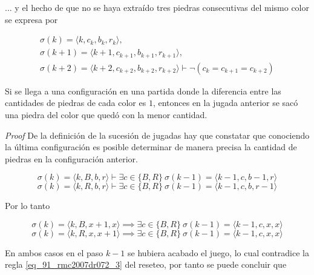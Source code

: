 ... y el hecho de que no se haya extraído tres piedras consecutivas del mismo color se expresa por 

\begin{equation} \label{eq_91_rmc2007dr072_5}
\begin{gathered}
	\sigma(k) = \langle k, c_k, b_k, r_k \rangle , \\
	\sigma(k+1) = \langle k+1, c_{k+1}, b_{k+1}, r_{k+1} \rangle, \\
	\sigma(k+2) = \langle k+2, c_{k+2}, b_{k+2}, r_{k+2} \rangle \vdash \neg (c_{k} = c_{k+1} = c_{k+2})
\end{gathered}
\end{equation}

\begin{claim}
	Si se llega a una configuración en una partida donde la diferencia entre las cantidades de piedras de cada color es $1$, entonces en la jugada anterior se sacó una piedra del color que quedó con la menor cantidad.
\end{claim}

\textit{Proof} De la definición de la sucesión de jugadas hay que constatar que conociendo la última configuración es posible determinar de manera precisa la cantidad de piedras en la configuración anterior.

\begin{equation} \label{eq_91_rmc2007dr072_6}
	\sigma(k) = \langle k, B, b, r \rangle \vdash \exists c \in \{B,R\}\ \sigma(k-1) = \langle k-1, c, b-1, r \rangle
\end{equation}
\begin{equation} \label{eq_91_rmc2007dr072_7}
	\sigma(k) = \langle k, R, b, r \rangle \vdash \exists c \in \{B,R\}\ \sigma(k-1) = \langle k-1, c, b, r-1 \rangle
\end{equation}

Por lo tanto 

\begin{equation} \label{eq_91_rmc2007dr072_8}
	\sigma(k) = \langle k, B, x+1, x \rangle \implies \exists c \in \{B,R\}\ \sigma(k-1) = \langle k-1, c, x, x \rangle
\end{equation}
\begin{equation} \label{eq_91_rmc2007dr072_9}
	\sigma(k) = \langle k, R, x, x+1 \rangle \implies \exists c \in \{B,R\}\ \sigma(k-1) = \langle k-1, c, x, x \rangle
\end{equation}

En ambos casos en el paso $k-1$ se hubiera acabado el juego, lo cual contradice la regla \cref{eq_91_rmc2007dr072_3} del reseteo, por tanto se puede concluir que

